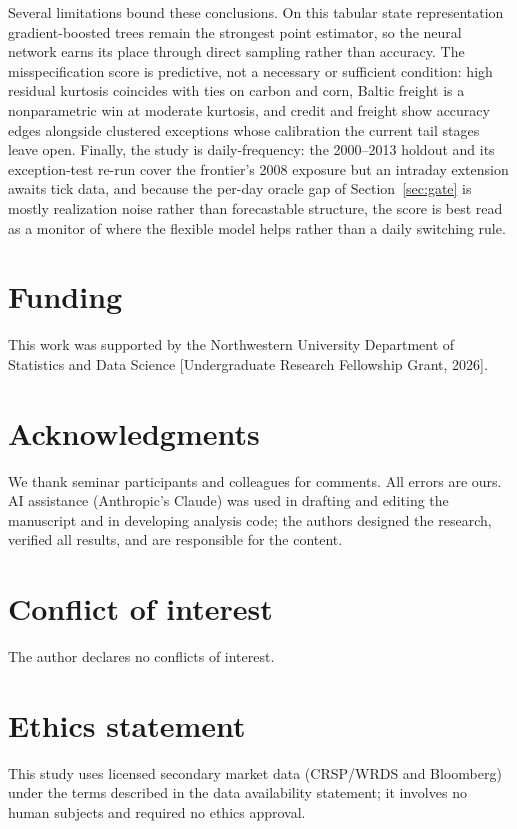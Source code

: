 \documentclass[11pt]{article}
\theoremstyle{remark}
\begin{document}
Several limitations bound these conclusions. On this tabular state
representation gradient-boosted trees remain the strongest point
estimator, so the neural network earns its place through direct
sampling rather than accuracy. The misspecification score is
predictive, not a necessary or sufficient condition: high residual
kurtosis coincides with ties on carbon and corn, Baltic freight is a
nonparametric win at moderate kurtosis, and credit and freight show
accuracy edges alongside clustered exceptions whose calibration the
current tail stages leave open. Finally, the study is daily-frequency:
the 2000--2013 holdout and its exception-test re-run cover the
frontier's 2008 exposure but an intraday extension awaits tick data,
and because the per-day oracle gap of Section~\ref{sec:gate} is mostly
realization noise rather than forecastable structure, the score is best
read as a monitor of where the flexible model helps rather than a
daily switching rule.

\section*{Funding}
This work was supported by the Northwestern University Department of
Statistics and Data Science [Undergraduate Research Fellowship Grant,
2026].

\section*{Acknowledgments}
We thank seminar participants and colleagues for comments. All errors
are ours.
AI assistance (Anthropic's Claude) was used in drafting and editing
the manuscript and in developing analysis code; the authors designed
the research, verified all results, and are responsible for the
content.

\section*{Conflict of interest}
The author declares no conflicts of interest.

\section*{Ethics statement}
This study uses licensed secondary market data (CRSP/WRDS and
Bloomberg) under the terms described in the data availability
statement; it involves no human subjects and required no ethics
approval.
\end{document}
